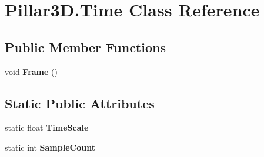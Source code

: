 \hypertarget{class_pillar3_d_1_1_time}{}\section{Pillar3\+D.\+Time Class Reference}
\label{class_pillar3_d_1_1_time}
\subsection*{Public Member Functions}
\begin{DoxyCompactItemize}
\item 
\mbox{\label{class_pillar3_d_1_1_time_a10919378ee5b28a69a8b8b1452fe87e1}} 
void {\bfseries Frame} ()
\end{DoxyCompactItemize}
\subsection*{Static Public Attributes}
\begin{DoxyCompactItemize}
\item 
\mbox{\label{class_pillar3_d_1_1_time_a933d9a77b8cdb43ccd08c4eb8a1462df}} 
static float {\bfseries Time\+Scale}
\item 
\mbox{\label{class_pillar3_d_1_1_time_acbd9879ea141bec6ed6219e248686b67}} 
static int {\bfseries Sample\+Count}
\end{DoxyCompactItemize}
